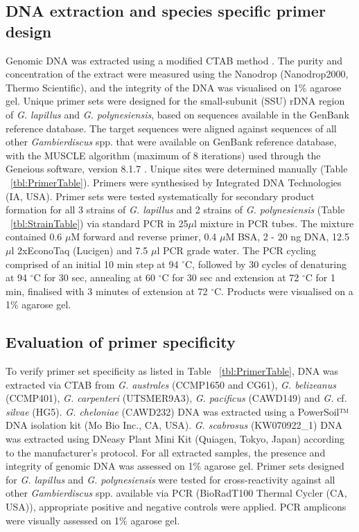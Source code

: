\documentclass[12pt]{article}
\begin{document}
\subsection*{DNA extraction and species specific primer design}
Genomic DNA was extracted using a modified CTAB method \citep{verma2016molecular}. The purity and concentration of the extract were measured using the Nanodrop (Nanodrop2000, Thermo Scientific), and the integrity of the DNA was visualised on 1\% agarose gel.
Unique primer sets were designed for the small-subunit (SSU) rDNA region of \emph{G. lapillus} and \emph{G. polynesiensis}, based on sequences available in the GenBank reference database. The target sequences were aligned against sequences of all other \emph{Gambierdiscus} spp. that were available on GenBank reference database, with the MUSCLE algorithm (maximum of 8 iterations) \citep{edgar2004muscle} used through the Geneious software, version 8.1.7 \citep{kearse2012geneious}. Unique sites were determined manually (Table ~\ref{tbl:PrimerTable}). Primers were synthesised by Integrated DNA Technologies (IA, USA).
Primer sets were tested systematically for secondary product formation for all 3 strains of \emph{G. lapillus} and 2 strains of \emph{G. polynesiensis} (Table ~\ref{tbl:StrainTable}) via standard PCR in 25$\mu$l mixture in PCR tubes. The mixture contained 0.6 $\mu$M forward and reverse primer, 0.4 $\mu$M BSA, 2 - 20 ng DNA, 12.5 $\mu$l 2xEconoTaq (Lucigen) and 7.5 $\mu$l PCR grade water.
The PCR cycling comprised of an initial 10 min step at 94 $^{\circ}$C, followed by 30 cycles of denaturing at 94 $^{\circ}$C for 30 sec, annealing at 60 $^{\circ}$C for 30 sec and extension at 72 $^{\circ}$C for 1 min, finalised with 3 minutes of extension at 72 $^{\circ}$C. Products were visualised on a 1\% agarose gel.


\subsection*{Evaluation of primer specificity}
To verify primer set specificity as listed in Table ~\ref{tbl:PrimerTable}, DNA was extracted via CTAB from \emph{G. australes} (CCMP1650 and CG61), \emph{G. belizeanus} (CCMP401), \emph{G. carpenteri} (UTSMER9A3), \emph{G. pacificus} (CAWD149) and \emph{G.} cf. \emph{silvae} (HG5). \emph{G. cheloniae} (CAWD232) DNA was extracted using a PowerSoil™ DNA isolation kit (Mo Bio Inc., CA, USA). \emph{G. scabrosus} (KW070922\_1) DNA was extracted using DNeasy Plant Mini Kit (Quiagen, Tokyo, Japan) according to the manufacturer's protocol. For all extracted samples, the presence and integrity of genomic DNA was assessed on 1\% agarose gel. Primer sets designed for \emph{G. lapillus} and \emph{G. polynesiensis} were tested for cross-reactivity against all other \emph{Gambierdiscus} spp. available via PCR (BioRadT100 Thermal Cycler (CA, USA)), appropriate positive and negative controls were applied. PCR amplicons were visually assessed on 1\% agarose gel.
\end{document}
